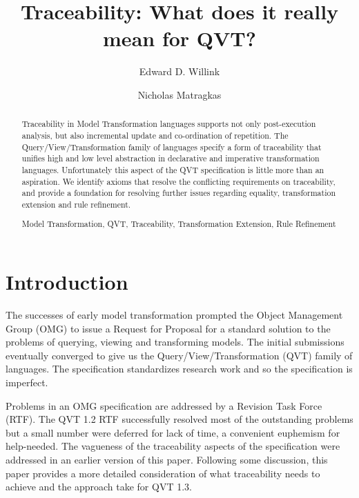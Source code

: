 \documentclass[runningheads,a4paper]{llncs}
\newcommand{\keywords}[1]{\par\addvspace\baselineskip
\noindent\keywordname\enspace\ignorespaces#1}
\begin{document}
\mainmatter

\title{Traceability: What does it really mean for QVT?}


\author{Edward D. Willink
\and Nicholas Matragkas}


\maketitle


\begin{abstract}


Traceability in Model Transformation languages supports not only post-execution analysis, but also incremental update and co-ordination of repetition. The Query/View/Transformation family of languages specify a form of traceability that unifies high and low level abstraction in declarative and imperative transformation languages. Unfortunately this aspect of the QVT specification is little more than an aspiration. We identify axioms that resolve the conflicting requirements on traceability, and provide a foundation for resolving further issues regarding equality, transformation extension and rule refinement.
\keywords{Model Transformation, QVT, Traceability, Transformation Extension, Rule Refinement}
\end{abstract}


\section{Introduction}

The successes of early model transformation prompted the Object Management Group (OMG) to issue a Request for Proposal for a standard solution to the problems of querying, viewing and transforming models. The initial submissions eventually converged to give us the Query/View/Transformation (QVT) family of languages. The specification standardizes research work and so the specification is imperfect.

Problems in an OMG specification are addressed by a Revision Task Force (RTF). The QVT 1.2 RTF successfully resolved most of the outstanding problems but a small number were deferred for lack of time, a convenient euphemism for help-needed. The vagueness of the traceability aspects of the specification were addressed in an earlier version of this paper. Following some discussion, this paper provides a more detailed consideration of what traceability needs to achieve and the approach take for QVT 1.3.
\end{document}
